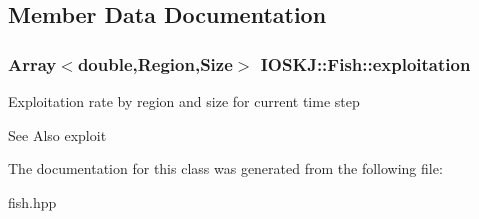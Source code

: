 \subsection{Member Data Documentation}
\hypertarget{classIOSKJ_1_1Fish_ac75234d73d32d8aa63243b54b20c0fa1}{
\subsubsection[{exploitation}]{\setlength{\rightskip}{0pt plus 5cm}Array$<$double,Region,Size$>$ I\-O\-S\-K\-J\-::\-Fish\-::exploitation}}\label{classIOSKJ_1_1Fish_ac75234d73d32d8aa63243b54b20c0fa1}
Exploitation rate by region and size for current time step

\begin{DoxySeeAlso}{See Also}
exploit 
\end{DoxySeeAlso}


The documentation for this class was generated from the following file\-:\begin{DoxyCompactItemize}
\item 
fish.\-hpp\end{DoxyCompactItemize}
